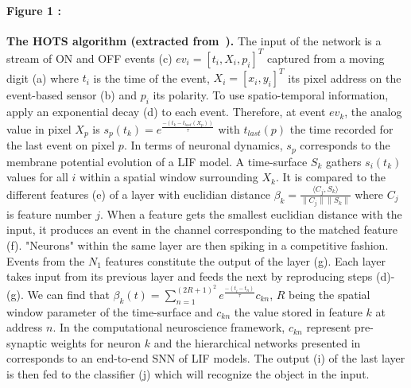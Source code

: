 \documentclass[12pt]{article}
\newcommand{\citep}[1]{\parencite{#1}}
\begin{document}
\paragraph*{Figure 1 : }
\textbf{The HOTS algorithm (extracted from~\citep{Lagorce17}).}  
The input of the network is a stream of ON and OFF events (c) $ev_i = [t_i,X_i,p_i]^T$ captured from a moving digit (a) where $t_i$ is the time of the event, $X_i=[x_i,y_i]^T$ its pixel address on the event-based sensor (b) and $p_i$ its polarity. To use spatio-temporal information, ~\citep{Lagorce17} apply an exponential decay (d) to each event. Therefore, at event $ev_k$, the analog value in pixel $X_p$ is $s_p(t_k) = e^\frac{-(t_k-t_{last}(X_p))}{\tau}$ with $t_{last}(p)$ the time recorded for the last event on pixel $p$. In terms of neuronal dynamics, $s_p$ corresponds to the membrane potential evolution of a LIF model. A time-surface $S_k$ gathers $s_i(t_k)$ values for all $i$ within a spatial window surrounding $X_k$. It is compared to the different features (e) of a layer with euclidian distance $ \beta_k = \frac{\langle C_j,S_k\rangle}{\|C_j\|\|S_k\|}$ where $C_j$ is feature number $j$. When a feature gets the smallest euclidian distance with the input, it produces an event in the channel corresponding to the matched feature (f). "Neurons" within the same layer are then spiking in a competitive fashion. Events from the $N_1$ features constitute the output of the layer (g). Each layer takes input from its previous layer and feeds the next by reproducing steps (d)-(g). We can find that $ \beta_k(t) =  \sum_{n=1}^{(2R+1)^2}e^\frac{-(t_i-t_n)}{\tau}c_{kn}$, $R$ being the spatial window parameter of the time-surface and $c_{kn}$ the value stored in feature $k$ at address $n$. In the computational neuroscience framework, $c_{kn}$ represent pre-synaptic weights for neuron $k$ and the hierarchical networks presented in ~\citep{Lagorce17} corresponds to an end-to-end SNN of LIF models. The output (i) of the last layer is then fed to the classifier (j) which will recognize the object in the input.

\end{document}
